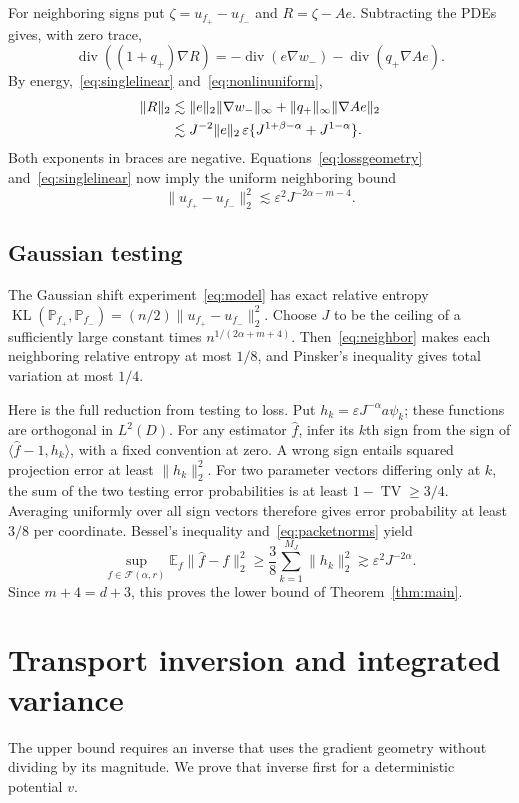 \documentclass[11pt]{article}
\theoremstyle{remark}
\newcommand{\E}{\mathbb E}
\newcommand{\Prob}{\mathbb P}
\newcommand{\cF}{\mathcal F}
\newcommand{\diver}{\operatorname{div}}
\newcommand{\TV}{\operatorname{TV}}
\newcommand{\KL}{\operatorname{KL}}
\newcommand{\norm}[1]{\lVert #1\rVert}
\newcommand{\ip}[2]{\langle #1,#2\rangle}
\begin{document}
For neighboring signs put $\zeta=u_{f_+}-u_{f_-}$ and $R=\zeta-Ae$. Subtracting the PDEs gives, with zero trace,
\[
 \diver((1+q_+)\nabla R)
 =-\diver(e\nabla w_-)-\diver(q_+\nabla Ae).
\]
By energy,~\eqref{eq:singlelinear} and~\eqref{eq:nonlinuniform},
\begin{align}
 \norm R_2
 &\lesssim\norm e_2\norm{\nabla w_-}_\infty
       +\norm{q_+}_\infty\norm{\nabla Ae}_2\notag\\
 &\lesssim J^{-2}\norm e_2\,
 \varepsilon\{J^{1+\beta-\alpha}+J^{1-\alpha}\}.
 \label{eq:nonlinremainder}
\end{align}
Both exponents in braces are negative. Equations~\eqref{eq:lossgeometry} and~\eqref{eq:singlelinear} now imply the uniform neighboring bound
\begin{equation}\label{eq:neighbor}
 \norm{u_{f_+}-u_{f_-}}_2^2
 \lesssim\varepsilon^2J^{-2\alpha-m-4}.
\end{equation}

\subsection{Gaussian testing}
The Gaussian shift experiment~\eqref{eq:model} has exact relative entropy
$\KL(\Prob_{f_+},\Prob_{f_-})=(n/2)\norm{u_{f_+}-u_{f_-}}_2^2$.
Choose $J$ to be the ceiling of a sufficiently large constant times
$n^{1/(2\alpha+m+4)}$. Then~\eqref{eq:neighbor} makes each neighboring relative entropy at most $1/8$, and Pinsker's inequality gives total variation at most $1/4$.

Here is the full reduction from testing to loss.  Put $h_k=\varepsilon J^{-\alpha}a\psi_k$; these functions are orthogonal in $L^2(D)$. For any estimator $\widehat f$, infer its $k$th sign from the sign of $\ip{\widehat f-1}{h_k}$, with a fixed convention at zero. A wrong sign entails squared projection error at least $\norm{h_k}_2^2$. For two parameter vectors differing only at $k$, the sum of the two testing error probabilities is at least $1-\TV\ge3/4$. Averaging uniformly over all sign vectors therefore gives error probability at least $3/8$ per coordinate. Bessel's inequality and~\eqref{eq:packetnorms} yield
\[
 \sup_{f\in\cF(\alpha,r)}\E_f\norm{\widehat f-f}_2^2
 \ge\frac38\sum_{k=1}^{M_J}\norm{h_k}_2^2
 \gtrsim\varepsilon^2J^{-2\alpha}.
\]
Since $m+4=d+3$, this proves the lower bound of Theorem~\ref{thm:main}.

\section{Transport inversion and integrated variance}\label{sec:transport}
The upper bound requires an inverse that uses the gradient geometry without dividing by its magnitude. We prove that inverse first for a deterministic potential $v$.
\end{document}
